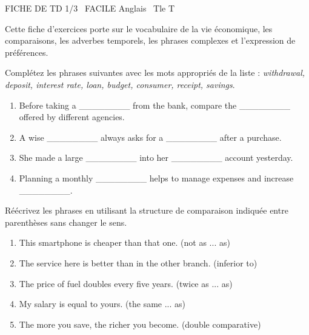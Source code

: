 \documentclass[11pt]{article}
\begin{document}
\begin{tcolorbox}[enhanced,colback=popink,colframe=popink,arc=10pt,boxrule=0pt,left=12pt,right=12pt,top=9pt,bottom=9pt]
{\color{white}\popxbold\small FICHE DE TD 1/3 \textbullet\ FACILE \hfill Anglais \textbullet\ Tle T\par}
\end{tcolorbox}
\vspace{4pt}
Cette fiche d'exercices porte sur le vocabulaire de la vie économique, les comparaisons, les adverbes temporels, les phrases complexes et l'expression de préférences.

\begin{exercice}
Complétez les phrases suivantes avec les mots appropriés de la liste : \textit{withdrawal, deposit, interest rate, loan, budget, consumer, receipt, savings}.
\begin{enumerate}
    \item Before taking a \_\_\_\_\_\_\_\_ from the bank, compare the \_\_\_\_\_\_\_\_ offered by different agencies.
    \item A wise \_\_\_\_\_\_\_\_ always asks for a \_\_\_\_\_\_\_\_ after a purchase.
    \item She made a large \_\_\_\_\_\_\_\_ into her \_\_\_\_\_\_\_\_ account yesterday.
    \item Planning a monthly \_\_\_\_\_\_\_\_ helps to manage expenses and increase \_\_\_\_\_\_\_\_.
\end{enumerate}
\end{exercice}

\begin{exercice}
Réécrivez les phrases en utilisant la structure de comparaison indiquée entre parenthèses sans changer le sens.
\begin{enumerate}
    \item This smartphone is cheaper than that one. (not as ... as)
    \item The service here is better than in the other branch. (inferior to)
    \item The price of fuel doubles every five years. (twice as ... as)
    \item My salary is equal to yours. (the same ... as)
    \item The more you save, the richer you become. (double comparative)
\end{enumerate}
\end{exercice}
\end{document}
